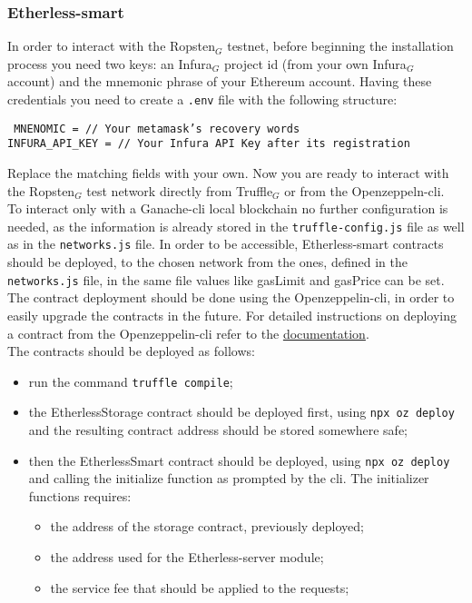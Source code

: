 \subsubsection{Etherless-smart}
	In order to interact with the Ropsten$_{G}$ testnet, before beginning the installation process you need two keys: an Infura$_{G}$ project id (from your own Infura$_{G}$ account) and the mnemonic phrase of your Ethereum account. Having these credentials you need to create a \texttt{.env} file with the following structure:\\
	\begin{center}
		\texttt{
		MNENOMIC = // Your metamask's recovery words}\\
		\texttt{INFURA\_API\_KEY = // Your Infura API Key after its registration}
	\end{center}
	Replace the matching fields with your own. Now you are ready to interact with the Ropsten$_{G}$ test network directly from Truffle$_{G}$ or from the Openzeppeln-cli.\\
	To interact only with a Ganache-cli local blockchain no further configuration is needed, as the information is already stored in the \texttt{truffle-config.js} file as well as in the \texttt{networks.js} file.
	In order to be accessible, Etherless-smart contracts should be deployed, to the chosen network from the ones, defined in the \texttt{networks.js} file, in the same file values like gasLimit and gasPrice can be set. The contract deployment should be done using the Openzeppelin-cli, in order to easily upgrade the contracts in the future. For detailed instructions on deploying a contract from the Openzeppelin-cli refer to the \href{https://docs.openzeppelin.com/learn/deploying-and-interacting#deploying-a-smart-contract}{documentation}.\\
	The contracts should be deployed as follows:
	\begin{itemize}
		\item run the command \texttt{truffle compile};
		\item the EtherlessStorage contract should be deployed first, using \texttt{npx oz deploy} and the resulting contract address should be stored somewhere safe;
		\item then the EtherlessSmart contract should be deployed, using \texttt{npx oz deploy} and calling the initialize function as prompted by the cli. The initializer functions requires:
		\begin{itemize}
			\item the address of the storage contract, previously deployed;
			\item the address used for the Etherless-server module;
			\item the service fee that should be applied to the requests;
		\end{itemize}
	\end{itemize}
